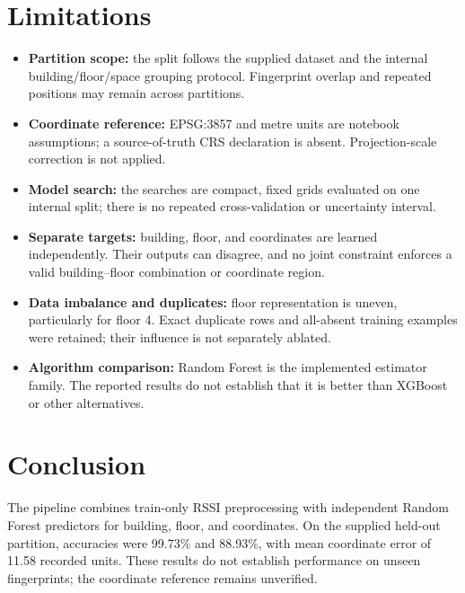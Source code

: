 \documentclass[conference]{IEEEtran}
\begin{document}
\section{Limitations}
\begin{itemize}
  \item \textbf{Partition scope:} the split follows the supplied dataset and the internal building/floor/space grouping protocol. Fingerprint overlap and repeated positions may remain across partitions.
  \item \textbf{Coordinate reference:} EPSG:3857 and metre units are notebook assumptions; a source-of-truth CRS declaration is absent. Projection-scale correction is not applied.
  \item \textbf{Model search:} the searches are compact, fixed grids evaluated on one internal split; there is no repeated cross-validation or uncertainty interval.
  \item \textbf{Separate targets:} building, floor, and coordinates are learned independently. Their outputs can disagree, and no joint constraint enforces a valid building--floor combination or coordinate region.
  \item \textbf{Data imbalance and duplicates:} floor representation is uneven, particularly for floor 4. Exact duplicate rows and all-absent training examples were retained; their influence is not separately ablated.
  \item \textbf{Algorithm comparison:} Random Forest is the implemented estimator family. The reported results do not establish that it is better than XGBoost or other alternatives.
\end{itemize}

\section{Conclusion}
The pipeline combines train-only RSSI preprocessing with independent Random Forest predictors for building, floor, and coordinates. On the supplied held-out partition, accuracies were 99.73\% and 88.93\%, with mean coordinate error of 11.58 recorded units. These results do not establish performance on unseen fingerprints; the coordinate reference remains unverified.
\end{document}
